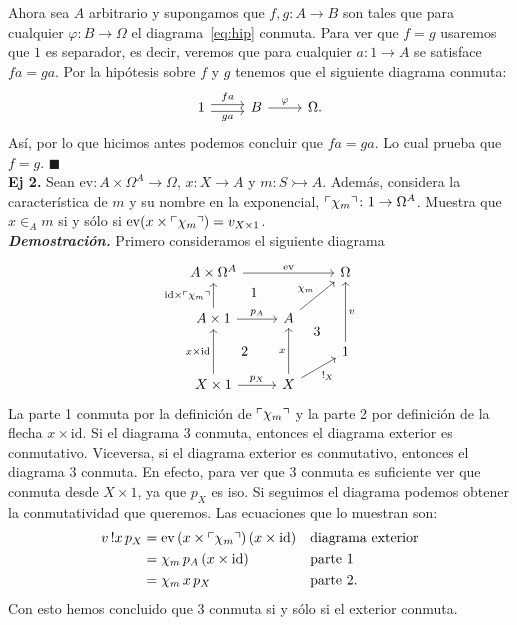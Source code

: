\documentclass[11pt]{article}
\DeclarePairedDelimiter{\name}{\ulcorner}{\urcorner}
\newcommand{\ev}{\mathrm{ev}}
\newcommand{\id}{\mathrm{id}}
\newcommand{\QED}{\hfill\ensuremath{\blacksquare}}
\begin{document}
  Ahora sea \(A\) arbitrario y supongamos que \(f,g\colon A\to B\) son tales
  que para cualquier \(\varphi\colon B\to\Omega\) el diagrama~\eqref{eq:hip}
  conmuta. Para ver que \(f = g\) usaremos que \(1\) es separador, es decir,
  veremos que para cualquier \(a\colon 1\to A\) se satisface \(fa=ga\).
  Por la hipótesis sobre \(f\) y \(g\) tenemos que el siguiente diagrama
  conmuta:
  \begin{equation*}
    \begin{tikzcd}[ampersand replacement=\&]
      1\ar[shift left]{r}{fa}\ar[shift right]{r}[swap]{ga}\& B\ar{r}{\varphi}\& \Omega.    
    \end{tikzcd}
  \end{equation*}
  Así, por lo que hicimos antes podemos concluir que \(fa = ga\). Lo cual prueba que $f=g$. \QED \\

  \textbf{Ej 2.} Sean \(\ev\colon A\times\Omega^A\to\Omega\), \(x\colon X\to A\) y 
  \(m\colon S\rightarrowtail A\). Además, considera la característica de \(m\) y
  su nombre en la exponencial, \(\name{\chi_m}\colon 1\to\Omega^A\). Muestra que 
  \(x\in_A m\) si y sólo si \(\ev(x\times\name{\chi_m}) = v_{X\times 1}\). \\

  \textbf{\textit{Demostración.}} Primero consideramos el siguiente diagrama
  \begin{equation}\label{eq:diagrama}
    \begin{tikzcd}[ampersand replacement=\&]
      A\times\Omega^A\ar{rr}{\ev} \&\& \Omega\\
      A\times 1\ar{u}{\id\times\name{\chi_m}}[name=a]{}\ar{r}{p_A}
      \& A\ar{ru}[name=b]{\chi_m} \\[-2ex]
      \&\& 1\ar{uu}[swap,name=y]{v} \\[-2ex]
      X\times 1\ar{uu}{x\times\id}[name=xid]{}\ar{r}{p_X}
      \& X\ar{uu}[name=x]{x}\ar{ur}[swap]{!_X}
      \ar[phantom, from=a, to=b, "1"]
      \ar[phantom, from=xid, to=x, "2"]
      \ar[phantom, from=x, to=y, "3"]
    \end{tikzcd}
  \end{equation}
  La parte 1 conmuta por la definición de \(\name{\chi_m}\) y la parte 2 por
  definición de la flecha \(x\times\id\). Si el diagrama 3 conmuta, entonces el
  diagrama exterior es conmutativo. Viceversa, si el diagrama exterior es
  conmutativo, entonces el diagrama 3 conmuta. En efecto, para ver que 3 conmuta
  es suficiente ver que conmuta desde \(X\times 1\), ya que \(p_X\) es iso. Si
  seguimos el diagrama podemos obtener la conmutatividad que queremos. Las
  ecuaciones que lo muestran son:
  \begin{align*}
    v\,!x\,p_X &= \ev\,(x\times\name{\chi_m})\,(x\times\id)
    && \text{diagrama exterior}\\
    & = \chi_m\,p_A\,(x\times\id) && \text{parte 1}\\
    &= \chi_m\,x\,p_X && \text{parte 2.}
  \end{align*} 
  Con esto hemos concluido que 3 conmuta si y sólo si el exterior conmuta.
\end{document}
